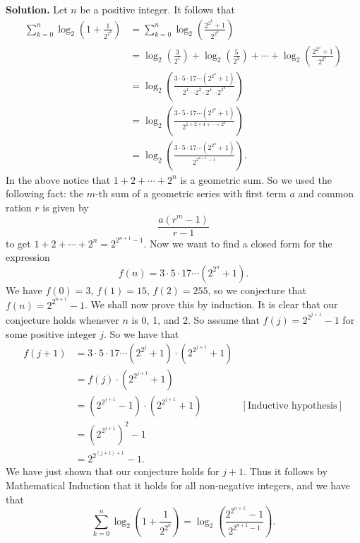 \documentclass[9pt]{article}
\begin{document}
\begin{enumerate}
      \textbf{Solution.} Let $n$ be a positive integer. It follows that
      \begin{align*}
         \sum_{k=0}^n\log_2\left(1 + \frac{1}{2^{2^k}}\right) &=
            \sum_{k=0}^n\log_2\left(\frac{2^{2^k}+1}{2^{2^k}}\right) \\
            &= \log_2\left(\frac{3}{2^1}\right) +
               \log_2\left(\frac{5}{2^2}\right) + \cdots +
               \log_2\left(\frac{2^{2^n}+1}{2^{2^n}}\right) \\
            &= \log_2\left(\frac{3\cdot5\cdot17\cdots(2^{2^n}+1)}
                  {2^1\cdot\cdot2^2\cdot2^4\cdots2^{2^n}}\right) \\
            &= \log_2\left(\frac{3\cdot5\cdot17\cdots(2^{2^n}+1)}
                  {2^{1+2+4+\cdots+2^n}}\right) \\
            &= \log_2\left(\frac{3\cdot5\cdot17\cdots(2^{2^n}+1)}
                  {2^{2^{n+1}-1}}\right).
      \end{align*}
      In the above notice that $1 + 2 + \cdots + 2^n$ is a geometric sum. So we
      used the following fact: the $m$-th sum of a geometric series with first
      term $a$ and common ration $r$ is given by
      $$\frac{a(r^m - 1)}{r - 1}$$
      to get $1 + 2 + \cdots + 2^n = 2^{2^{n+1}-1}$. Now we want to find a
      closed form for the expression
      $$f(n) = 3\cdot5\cdot17\cdots(2^{2^n}+1).$$
      We have $f(0) = 3$, $f(1) = 15$, $f(2) = 255$, so we conjecture that
      $f(n) = 2^{2^{n+1}} - 1$. We shall now prove this by induction. It is
      clear that our conjecture holds whenever $n$ is 0, 1, and 2. So assume
      that $f(j) = 2^{2^{j+1}} - 1$ for some positive integer $j$. So we have
      that
      \begin{align*}
         f(j+1) &= 3\cdot5\cdot17\cdots(2^{2^j}+1)\cdot(2^{2^{j+1}}+1) \\
            &= f(j) \cdot (2^{2^{j+1}}+1) \\
            &= (2^{2^{j+1}} - 1)\cdot (2^{2^{j+1}}+1)
               &[\text{Inductive hypothesis}] \\
            &= (2^{2^{j+1}})^2 - 1\\
            &= 2^{2^{(j+1)+1}} - 1.
      \end{align*}
      We have just shown that our conjecture holds for $j + 1$. Thus it follows
      by Mathematical Induction that it holds for all non-negative integers, and
      we have that
      $$\sum_{k=0}^n\log_2\left(1 + \frac{1}{2^{2^k}}\right) =
           \log_2\left(\frac{2^{2^{n+1}} - 1}{2^{2^{n+1}-1}}\right).$$
           

\end{enumerate}
\end{document}
